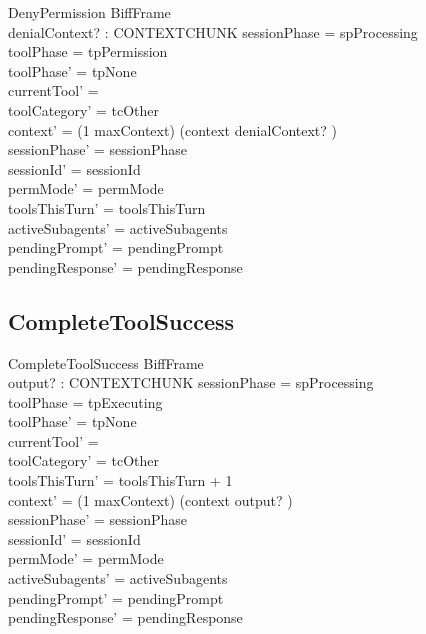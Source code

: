 \documentclass[a4paper,10pt,fleqn]{article}
\begin{document}
\begin{schema}{DenyPermission}
  BiffFrame \\
  denialContext? : CONTEXTCHUNK
  \where
  sessionPhase = spProcessing \\
  toolPhase = tpPermission \\
  toolPhase' = tpNone \\
  currentTool' = \emptyset \\
  toolCategory' = tcOther \\
  context' = (1 \upto maxContext) \dres (context \cat \langle denialContext? \rangle) \\
  sessionPhase' = sessionPhase \\
  sessionId' = sessionId \\
  permMode' = permMode \\
  toolsThisTurn' = toolsThisTurn \\
  activeSubagents' = activeSubagents \\
  pendingPrompt' = pendingPrompt \\
  pendingResponse' = pendingResponse
\end{schema}

\subsection{CompleteToolSuccess}

\begin{schema}{CompleteToolSuccess}
  BiffFrame \\
  output? : CONTEXTCHUNK
  \where
  sessionPhase = spProcessing \\
  toolPhase = tpExecuting \\
  toolPhase' = tpNone \\
  currentTool' = \emptyset \\
  toolCategory' = tcOther \\
  toolsThisTurn' = toolsThisTurn + 1 \\
  context' = (1 \upto maxContext) \dres (context \cat \langle output? \rangle) \\
  sessionPhase' = sessionPhase \\
  sessionId' = sessionId \\
  permMode' = permMode \\
  activeSubagents' = activeSubagents \\
  pendingPrompt' = pendingPrompt \\
  pendingResponse' = pendingResponse
\end{schema}
\end{document}
